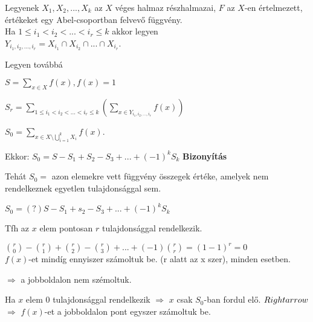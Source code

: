 \begin{frame}
  \begin{tcolorbox}[title={Tétel: Logikai szita formula}]
    Legyenek $X_1, X_2, ..., X_k$ az $X$ véges halmaz részhalmazai, $F$ az $X$-en értelmezett, értékeket egy Abel-csoportban felvevő függvény.\\
    Ha $1 \leq i_1 < i_2 < ... < i_r \leq k$ akkor legyen\\
    $Y_{i_1, i_2, ..., i_r} = X_{i_1} \cap X_{i_2} \cap ... \cap X_{i_r}$.\\
    \mmedskip

    Legyen továbbá
    \mmedskip

    $S = \sum_{x \in X} f(x), f(x) = 1$\\
    \mmedskip

    $S_r = \sum_{1 \leq i_1 < i_2 < ... < i_r \leq k} (\sum_{x \in Y_{i_1, i_2, ..., i_r}} f(x))$ \\
    \mmedskip

    $S_0 = \sum_{x \in X \setminus \bigcup^k_{i = 1} X_i} f(x)$.\\
    \mmedskip

    Ekkor: $S_0 = S - S_1 + S_2 - S_3 + ... + (-1)^kS_k$
  \tcblower
    \textbf{Bizonyítás}\\
    \mmedskip

    Tehát $S_0 =$ azon elemekre vett függvény összegek értéke, amelyek nem rendelkeznek egyetlen tulajdonsággal sem.\\
    \mmedskip

    $S_0 =(?) S - S_1 + s_2 - S_3 + ... + (-1)^k S_k$\\
    \mmedskip

    Tfh az $x$ elem pontosan $r$ tulajdonsággal rendelkezik.\\
    \mmedskip

    ${r \choose 0} - {r \choose 1} + {r \choose 2} - {r \choose 3} + ... + (-1) {r \choose r} = (1 - 1)^r = 0$\\
    $f(x)$-et mindíg ennyiszer számoltuk be. (r alatt az x szer), minden esetben.\\
    \mbigskip

    $\Rightarrow$ a jobboldalon nem szémoltuk.\\
    \mbigskip

    Ha $x$ elem $0$ tulajdonsággal rendelkezik $\Rightarrow$ $x$ csak $S_0$-ban fordul elő. $\\Rightarrow$\\
    $\Rightarrow$ $f(x)$-et a jobboldalon pont egyszer számoltuk be.
  \end{tcolorbox}
\end{frame}



